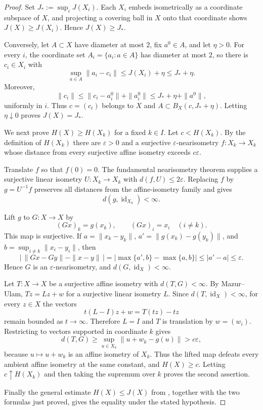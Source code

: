 \documentclass[11pt]{article}
\newcommand{\id}{\operatorname{id}}
\begin{document}
\begin{proof}
Set $J_*:=\sup_iJ(X_i)$.  Each $X_i$ embeds isometrically as a coordinate
subspace of $X$, and projecting a covering ball in $X$ onto that coordinate
shows $J(X)\geq J(X_i)$.  Hence $J(X)\geq J_*$.

Conversely, let $A\subset X$ have diameter at most $2$, fix $a^0\in A$, and
let $\eta>0$.  For every $i$, the coordinate set
$A_i=\{a_i:a\in A\}$ has diameter at most $2$, so there is $c_i\in X_i$ with
\[
 \sup_{a\in A}\|a_i-c_i\|\leq J(X_i)+\eta\leq J_*+\eta.
\]
Moreover,
\[
 \|c_i\|\leq\|c_i-a_i^0\|+\|a_i^0\|
 \leq J_*+\eta+\|a^0\|,
\]
uniformly in $i$.  Thus $c=(c_i)$ belongs to $X$ and
$A\subset B_X(c,J_*+\eta)$.  Letting $\eta\downarrow0$ proves
$J(X)=J_*$.

We next prove $H(X)\geq H(X_k)$ for a fixed $k\in I$.  Let
$c<H(X_k)$.  By the definition of $H(X_k)$ there are
$\varepsilon>0$ and a surjective $\varepsilon$-nearisometry
$f:X_k\to X_k$ whose distance from every surjective affine isometry exceeds
$c\varepsilon$.

Translate $f$ so that $f(0)=0$.  The fundamental nearisometry theorem
\cite[Theorem~2.2]{Vaisala} supplies a surjective linear isometry
$U:X_k\to X_k$ with $d(f,U)\leq2\varepsilon$.  Replacing $f$ by
$g=U^{-1}f$ preserves all distances from the affine-isometry family and gives
\[
 d(g,\id_{X_k})<\infty.
\]

Lift $g$ to $G:X\to X$ by
\[
 (Gx)_k=g(x_k),\qquad (Gx)_i=x_i\quad(i\neq k).
\]
This map is surjective.  If
$a=\|x_k-y_k\|$, $a'=\|g(x_k)-g(y_k)\|$, and
$b=\sup_{i\neq k}\|x_i-y_i\|$, then
\[
 \big|\,\|Gx-Gy\|-\|x-y\|\,\big|
 =|\max\{a',b\}-\max\{a,b\}|
 \leq|a'-a|\leq\varepsilon.
\]
Hence $G$ is an $\varepsilon$-nearisometry, and
$d(G,\id_X)<\infty$.

Let $T:X\to X$ be a surjective affine isometry with $d(T,G)<\infty$.
By Mazur--Ulam, $Tz=Lz+w$ for a surjective linear isometry $L$.  Since
$d(T,\id_X)<\infty$, for every $z\in X$ the vectors
\[
 t(L-I)z+w=T(tz)-tz
\]
remain bounded as $t\to\infty$.  Therefore $L=I$ and $T$ is translation by
$w=(w_i)$.  Restricting to vectors supported in coordinate $k$ gives
\[
 d(T,G)\geq\sup_{u\in X_k}\|u+w_k-g(u)\|>c\varepsilon,
\]
because $u\mapsto u+w_k$ is an affine isometry of $X_k$.  Thus the lifted
map defeats every ambient affine isometry at the same constant, and
$H(X)\geq c$.  Letting $c\uparrow H(X_k)$ and then taking the supremum over
$k$ proves the second assertion.

Finally the general estimate $H(X)\leq J(X)$ from \cite{Vaisala}, together
with the two formulas just proved, gives the equality under the stated
hypothesis.
\end{proof}
\end{document}
